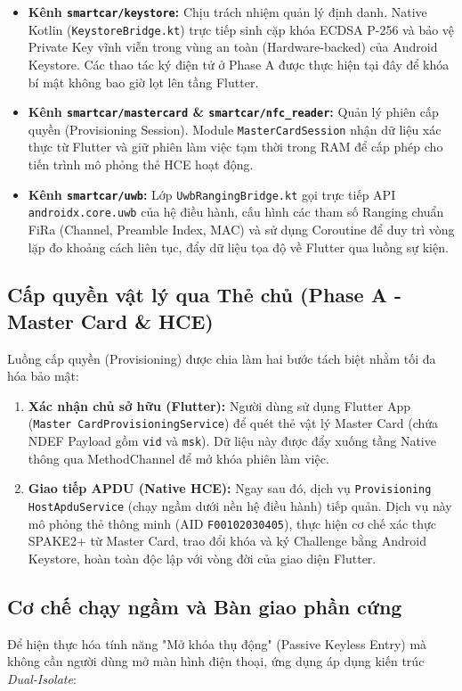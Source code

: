 \begin{itemize}
    \item \textbf{Kênh \texttt{smartcar/keystore}:} Chịu trách nhiệm quản lý định danh. Native Kotlin (\texttt{KeystoreBridge.kt}) trực tiếp sinh cặp khóa ECDSA P-256 và bảo vệ Private Key vĩnh viễn trong vùng an toàn (Hardware-backed) của Android Keystore. Các thao tác ký điện tử ở Phase A được thực hiện tại đây để khóa bí mật không bao giờ lọt lên tầng Flutter.
    \item \textbf{Kênh \texttt{smartcar/mastercard} \& \texttt{smartcar/nfc\_reader}:} Quản lý phiên cấp quyền (Provisioning Session). Module \texttt{MasterCardSession} nhận dữ liệu xác thực từ Flutter và giữ phiên làm việc tạm thời trong RAM để cấp phép cho tiến trình mô phỏng thẻ HCE hoạt động.
    \item \textbf{Kênh \texttt{smartcar/uwb}:} Lớp \texttt{UwbRangingBridge.kt} gọi trực tiếp API \texttt{androidx.core.uwb} của hệ điều hành, cấu hình các tham số Ranging chuẩn FiRa (Channel, Preamble Index, MAC) và sử dụng Coroutine để duy trì vòng lặp đo khoảng cách liên tục, đẩy dữ liệu tọa độ về Flutter qua luồng sự kiện.
\end{itemize}

\subsection{Cấp quyền vật lý qua Thẻ chủ (Phase A - Master Card \& HCE)}
Luồng cấp quyền (Provisioning) được chia làm hai bước tách biệt nhằm tối đa hóa bảo mật:
\begin{enumerate}
    \item \textbf{Xác nhận chủ sở hữu (Flutter):} Người dùng sử dụng Flutter App (\texttt{Master CardProvisioningService}) để quét thẻ vật lý Master Card (chứa NDEF Payload gồm \texttt{vid} và \texttt{msk}). Dữ liệu này được đẩy xuống tầng Native thông qua MethodChannel để mở khóa phiên làm việc.
    \item \textbf{Giao tiếp APDU (Native HCE):} Ngay sau đó, dịch vụ \texttt{Provisioning HostApduService} (chạy ngầm dưới nền hệ điều hành) tiếp quản. Dịch vụ này mô phỏng thẻ thông minh (AID \texttt{F00102030405}), thực hiện cơ chế xác thực SPAKE2+ từ Master Card, trao đổi khóa và ký Challenge bằng Android Keystore, hoàn toàn độc lập với vòng đời của giao diện Flutter.
\end{enumerate}

\subsection{Cơ chế chạy ngầm và Bàn giao phần cứng}
Để hiện thực hóa tính năng "Mở khóa thụ động" (Passive Keyless Entry) mà không cần người dùng mở màn hình điện thoại, ứng dụng áp dụng kiến trúc \textit{Dual-Isolate}:

